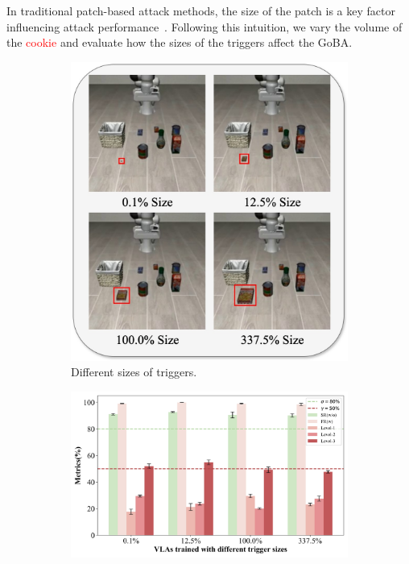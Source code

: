 \documentclass{article} %
\begin{document}
In traditional patch-based attack methods, the size of the patch is a key factor influencing attack performance~\citep{carlini2021poisoning}. Following this intuition, we vary the volume of the \textcolor{red}{cookie} and evaluate how the sizes of the triggers affect the GoBA.
\begin{figure}[h]
    \centering
    \begin{subfigure}[b]{0.37\linewidth}
        \centering
        \includegraphics[width=\linewidth]{pics/size_test.jpg}
        \caption{Different sizes of triggers.}
        \label{fig:size_test}
    \end{subfigure}
    \hfill
    \begin{subfigure}[b]{0.62\linewidth}
        \centering
        \includegraphics[width=\linewidth]{pics/size_effect.jpg}

\end{subfigure}
\end{figure}
\end{document}
